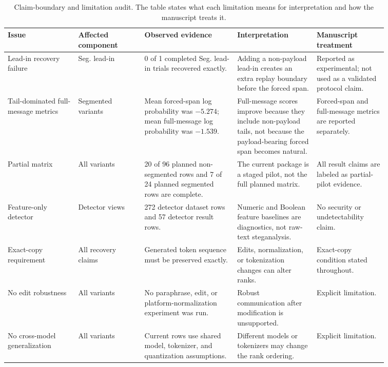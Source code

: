 \documentclass[fleqn,10pt]{wlscirep}
\begin{document}
\begin{table}[H]
\centering
\footnotesize
\setlength{\tabcolsep}{3pt}
\begin{tabular}{L{0.16\linewidth} L{0.15\linewidth} L{0.21\linewidth} L{0.18\linewidth} L{0.16\linewidth}}
\toprule
Issue & Affected component & Observed evidence & Interpretation & Manuscript treatment \\
\midrule
Lead-in recovery failure & Seg. lead-in & 0 of 1 completed Seg. lead-in trials recovered exactly. & Adding a non-payload lead-in creates an extra replay boundary before the forced span. & Reported as experimental; not used as a validated protocol claim. \\
Tail-dominated full-message metrics & Segmented variants & Mean forced-span log probability was \(-5.274\); mean full-message log probability was \(-1.539\). & Full-message scores improve because they include non-payload tails, not because the payload-bearing forced span becomes natural. & Forced-span and full-message metrics are reported separately. \\
Partial matrix & All variants & 20 of 96 planned non-segmented rows and 7 of 24 planned segmented rows are complete. & The current package is a staged pilot, not the full planned matrix. & All result claims are labeled as partial-pilot evidence. \\
Feature-only detector & Detector views & 272 detector dataset rows and 57 detector result rows. & Numeric and Boolean feature baselines are diagnostics, not raw-text steganalysis. & No security or undetectability claim. \\
Exact-copy requirement & All recovery claims & Generated token sequence must be preserved exactly. & Edits, normalization, or tokenization changes can alter ranks. & Exact-copy condition stated throughout. \\
No edit robustness & All variants & No paraphrase, edit, or platform-normalization experiment was run. & Robust communication after modification is unsupported. & Explicit limitation. \\
No cross-model generalization & All variants & Current rows use shared model, tokenizer, and quantization assumptions. & Different models or tokenizers may change the rank ordering. & Explicit limitation. \\
\bottomrule
\end{tabular}
\caption{\label{tab:s2}Claim-boundary and limitation audit. The table states what each limitation means for interpretation and how the manuscript treats it.}
\end{table}
\end{document}
